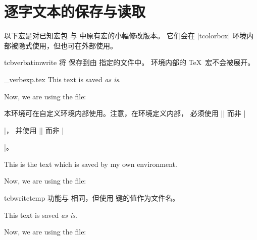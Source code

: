 \clearpage
\section{逐字文本的保存与读取}\label{sec:verbatim}%
%
以下宏是对已知宏包  与  中原有宏的小幅修改版本。
它们会在 |tcolorbox| 环境内部被隐式使用，但也可在外部使用。
\enlargethispage*{1.5cm}

\begin{docEnvironment}{tcbverbatimwrite}{}
  将 保存到由 指定的文件中。
  环境内部的 \TeX\ 宏不会被展开。
\begin{dispExample}
\begin{tcbverbatimwrite}{\jobname_verbexp.tex}
  This text is saved \textit{as is}.
\end{tcbverbatimwrite}

Now, we are using the file:\par

\end{dispExample}

本环境可在自定义环境内部使用。注意，在环境定义内部，
必须使用 |\tcbverbatimwrite| 而非 |\begin{tcbverbatimwrite}|，
并使用 |\endtcbverbatimwrite| 而非 |\end{tcbverbatimwrite}|。
\begin{dispExample}
\newenvironment{myverbatim}{%
  \begingroup{}}%
  {\endtcbverbatimwrite\endgroup}

\begin{myverbatim}
  This is the text which is saved by my own environment.
\end{myverbatim}

Now, we are using the file:\par

\end{dispExample}
\end{docEnvironment}

\begin{docEnvironment}{tcbwritetemp}{}
  功能与  相同，但使用 
  键的值作为文件名。
\begin{dispExample}
\begin{tcbwritetemp}
  This text is saved \textit{as is}.
\end{tcbwritetemp}

Now, we are using the file:\par
\tcbusetemp
\end{dispExample}
\end{docEnvironment}


